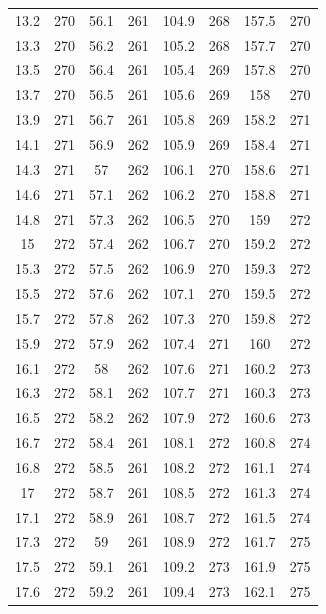 \documentclass[12pt]{ctexart}
\numberwithin{equation}{section}
\begin{document}
\begin{longtable}{cc|cc|cc|cc}
13.2  &  270  &  56.1  &  261  &  104.9  &  268  &  157.5  &  270  \\
13.3  &  270  &  56.2  &  261  &  105.2  &  268  &  157.7  &  270  \\
13.5  &  270  &  56.4  &  261  &  105.4  &  269  &  157.8  &  270  \\
13.7  &  270  &  56.5  &  261  &  105.6  &  269  &  158  &  270  \\
13.9  &  271  &  56.7  &  261  &  105.8  &  269  &  158.2  &  271  \\
14.1  &  271  &  56.9  &  262  &  105.9  &  269  &  158.4  &  271  \\
14.3  &  271  &  57  &  262  &  106.1  &  270  &  158.6  &  271  \\
14.6  &  271  &  57.1  &  262  &  106.2  &  270  &  158.8  &  271  \\
14.8  &  271  &  57.3  &  262  &  106.5  &  270  &  159  &  272  \\
15  &  272  &  57.4  &  262  &  106.7  &  270  &  159.2  &  272  \\
15.3  &  272  &  57.5  &  262  &  106.9  &  270  &  159.3  &  272  \\
15.5  &  272  &  57.6  &  262  &  107.1  &  270  &  159.5  &  272  \\
15.7  &  272  &  57.8  &  262  &  107.3  &  270  &  159.8  &  272  \\
15.9  &  272  &  57.9  &  262  &  107.4  &  271  &  160  &  272  \\
16.1  &  272  &  58  &  262  &  107.6  &  271  &  160.2  &  273  \\
16.3  &  272  &  58.1  &  262  &  107.7  &  271  &  160.3  &  273  \\
16.5  &  272  &  58.2  &  262  &  107.9  &  272  &  160.6  &  273  \\
16.7  &  272  &  58.4  &  261  &  108.1  &  272  &  160.8  &  274  \\
16.8  &  272  &  58.5  &  261  &  108.2  &  272  &  161.1  &  274  \\
17  &  272  &  58.7  &  261  &  108.5  &  272  &  161.3  &  274  \\
17.1  &  272  &  58.9  &  261  &  108.7  &  272  &  161.5  &  274  \\
17.3  &  272  &  59  &  261  &  108.9  &  272  &  161.7  &  275  \\
17.5  &  272  &  59.1  &  261  &  109.2  &  273  &  161.9  &  275  \\
17.6  &  272  &  59.2  &  261  &  109.4  &  273  &  162.1  &  275  \\

\end{longtable}
\end{document}
